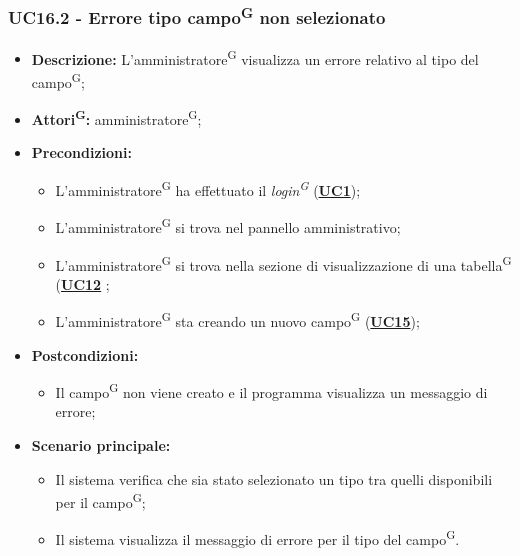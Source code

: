 \subsubsection{UC16.2 - Errore tipo campo\textsuperscript{G} non selezionato}
\label{sec:UC16.2}
\begin{itemize}
	\item \textbf{Descrizione:} L’amministratore\textsuperscript{G} visualizza un errore relativo al tipo del campo\textsuperscript{G};
	\item \textbf{Attori\textsuperscript{G}:} amministratore\textsuperscript{G};
	\item \textbf{Precondizioni:} 
	\begin{itemize}
		\item L’amministratore\textsuperscript{G} ha effettuato il \textit{login\textsuperscript{G}} (\hyperref[sec:UC1]{\textbf{UC1}});
		\item L’amministratore\textsuperscript{G} si trova nel pannello amministrativo;
		\item L’amministratore\textsuperscript{G} si trova nella sezione di visualizzazione di una tabella\textsuperscript{G} (\hyperref[sec:UC12]{\textbf{UC12}} ;
		\item L’amministratore\textsuperscript{G} sta creando un nuovo campo\textsuperscript{G} (\hyperref[sec:UC15]{\textbf{UC15}});
	\end{itemize}
	\item \textbf{Postcondizioni:} 
	\begin{itemize}
		\item Il campo\textsuperscript{G} non viene creato e il programma visualizza un messaggio di errore;
	\end{itemize}
	\item \textbf{Scenario principale:} 
	\begin{itemize}
		\item Il sistema verifica che sia stato selezionato un tipo tra quelli disponibili per il campo\textsuperscript{G};
		\item Il sistema visualizza il messaggio di errore per il tipo del campo\textsuperscript{G}.
	\end{itemize}
\end{itemize}

